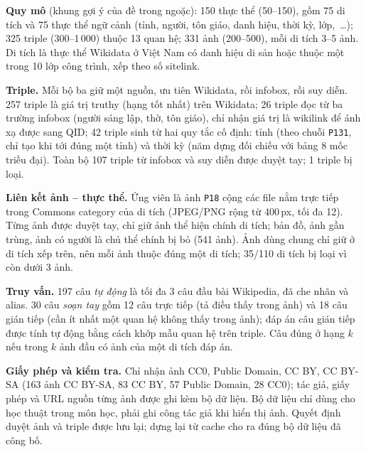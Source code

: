 \textbf{Quy mô} (khung gợi ý của đề trong ngoặc): 150 thực thể (50--150), gồm 75 di tích và 75 thực thể ngữ cảnh (tỉnh,
người, tôn giáo, danh hiệu, thời kỳ, lớp,~\ldots); 325 triple (300--1\,000) thuộc 13 quan hệ; 331 ảnh (200--500), mỗi di
tích 3--5 ảnh. Di tích là thực thể Wikidata ở Việt Nam có danh hiệu di sản hoặc thuộc một trong 10 lớp công trình, xếp theo
số sitelink.

\textbf{Triple.} Mỗi bộ ba giữ một nguồn, ưu tiên Wikidata, rồi infobox, rồi suy diễn. 257 triple là giá trị truthy (hạng
tốt nhất) trên Wikidata; 26 triple đọc từ ba trường infobox (người sáng lập, thờ, tôn giáo), chỉ nhận giá trị là wikilink
để ánh xạ được sang QID; 42 triple sinh từ hai quy tắc cố định: tỉnh (theo chuỗi \texttt{P131}, chỉ tạo khi tới đúng một
tỉnh) và thời kỳ (năm dựng đối chiếu với bảng 8 mốc triều đại). Toàn bộ 107 triple từ infobox và suy diễn được duyệt tay;
1 triple bị loại.

\textbf{Liên kết ảnh -- thực thể.} Ứng viên là ảnh \texttt{P18} cộng các file nằm trực tiếp trong Commons category của di
tích (JPEG/PNG rộng từ 400\,px, tối đa 12). Từng ảnh được duyệt tay, chỉ giữ ảnh thể hiện chính di tích; bản đồ, ảnh gần
trùng, ảnh có người là chủ thể chính bị bỏ (541 ảnh). Ảnh dùng chung chỉ giữ ở di tích xếp trên, nên mỗi ảnh thuộc đúng
một di tích; 35/110 di tích bị loại vì còn dưới 3 ảnh.

\textbf{Truy vấn.} 197 câu \emph{tự động} là tối đa 3 câu đầu bài Wikipedia, đã che nhãn và alias. 30 câu \emph{soạn tay}
gồm 12 câu trực tiếp (tả điều thấy trong ảnh) và 18 câu gián tiếp (cần ít nhất một quan hệ không thấy trong ảnh); đáp án
câu gián tiếp được tính tự động bằng cách khớp mẫu quan hệ trên triple. Câu đúng ở hạng $k$ nếu trong $k$ ảnh đầu có ảnh
của một di tích đáp án.

\textbf{Giấy phép và kiểm tra.} Chỉ nhận ảnh CC0, Public Domain, CC BY, CC BY-SA (163 ảnh CC BY-SA, 83 CC BY, 57 Public
Domain, 28 CC0); tác giả, giấy phép và URL nguồn từng ảnh được ghi kèm bộ dữ liệu. Bộ dữ liệu chỉ dùng cho học thuật
trong môn học, phải ghi công tác giả khi hiển thị ảnh. Quyết định duyệt ảnh và triple được lưu lại; dựng lại từ cache cho ra đúng bộ dữ liệu đã công bố.


